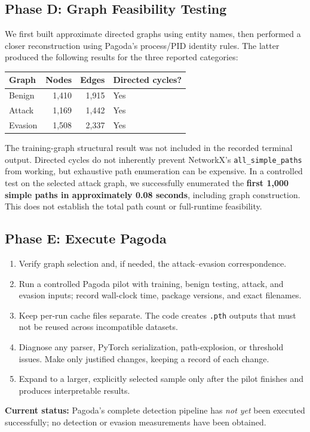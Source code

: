 \documentclass[11pt,letterpaper]{article}
\begin{document}
\subsection{Phase D: Graph Feasibility Testing}
We first built approximate directed graphs using entity names, then performed a closer reconstruction using Pagoda's process/PID identity rules. The latter produced the following results for the three reported categories:
\begin{center}
\begin{tabular}{@{}lrrl@{}}\toprule
\textbf{Graph} & \textbf{Nodes} & \textbf{Edges} & \textbf{Directed cycles?}\\\midrule
Benign & 1,410 & 1,915 & Yes\\
Attack & 1,169 & 1,442 & Yes\\
Evasion & 1,508 & 2,337 & Yes\\\bottomrule
\end{tabular}
\end{center}

The training-graph structural result was not included in the recorded terminal output. Directed cycles do not inherently prevent NetworkX's \texttt{all\_simple\_paths} from working, but exhaustive path enumeration can be expensive. In a controlled test on the selected attack graph, we successfully enumerated the \textbf{first 1,000 simple paths in approximately 0.08 seconds}, including graph construction. This does not establish the total path count or full-runtime feasibility.

\subsection{Phase E: Execute Pagoda}
\begin{enumerate}
\item Verify graph selection and, if needed, the attack--evasion correspondence.
\item Run a controlled Pagoda pilot with training, benign testing, attack, and evasion inputs; record wall-clock time, package versions, and exact filenames.
\item Keep per-run cache files separate. The code creates \texttt{.pth} outputs that must not be reused across incompatible datasets.
\item Diagnose any parser, PyTorch serialization, path-explosion, or threshold issues. Make only justified changes, keeping a record of each change.
\item Expand to a larger, explicitly selected sample only after the pilot finishes and produces interpretable results.
\end{enumerate}
\textbf{Current status:} Pagoda's complete detection pipeline has \emph{not yet} been executed successfully; no detection or evasion measurements have been obtained.
\end{document}

